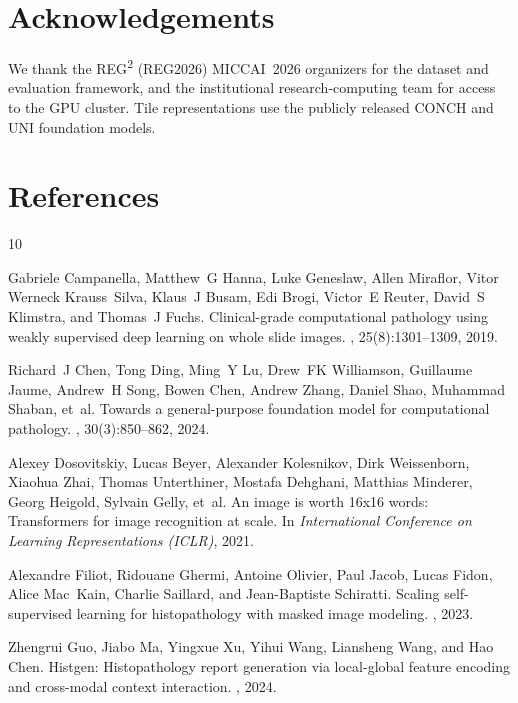 \documentclass[11pt,a4paper]{article}
\begin{document}
\section*{Acknowledgements}
We thank the REG\textsuperscript{2} (REG2026) MICCAI~2026 organizers for the dataset and
evaluation framework, and the institutional research-computing team for access to the GPU
cluster. Tile representations use the publicly released CONCH and UNI foundation models.

\section*{References}
\begin{thebibliography}{10}

Gabriele Campanella, Matthew~G Hanna, Luke Geneslaw, Allen Miraflor, Vitor
  Werneck Krauss~Silva, Klaus~J Busam, Edi Brogi, Victor~E Reuter, David~S
  Klimstra, and Thomas~J Fuchs.
\newblock Clinical-grade computational pathology using weakly supervised deep
  learning on whole slide images.
, 25(8):1301--1309, 2019.

Richard~J Chen, Tong Ding, Ming~Y Lu, Drew~FK Williamson, Guillaume Jaume,
  Andrew~H Song, Bowen Chen, Andrew Zhang, Daniel Shao, Muhammad Shaban, et~al.
\newblock Towards a general-purpose foundation model for computational
  pathology.
, 30(3):850--862, 2024.

Alexey Dosovitskiy, Lucas Beyer, Alexander Kolesnikov, Dirk Weissenborn,
  Xiaohua Zhai, Thomas Unterthiner, Mostafa Dehghani, Matthias Minderer, Georg
  Heigold, Sylvain Gelly, et~al.
\newblock An image is worth 16x16 words: Transformers for image recognition at
  scale.
\newblock In {\em International Conference on Learning Representations (ICLR)},
  2021.

Alexandre Filiot, Ridouane Ghermi, Antoine Olivier, Paul Jacob, Lucas Fidon,
  Alice Mac~Kain, Charlie Saillard, and Jean-Baptiste Schiratti.
\newblock Scaling self-supervised learning for histopathology with masked image
  modeling.
, 2023.

Zhengrui Guo, Jiabo Ma, Yingxue Xu, Yihui Wang, Liansheng Wang, and Hao Chen.
\newblock Histgen: Histopathology report generation via local-global feature
  encoding and cross-modal context interaction.
, 2024.


\end{thebibliography}
\end{document}
